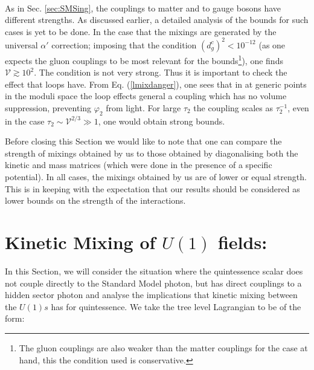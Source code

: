 \documentclass[11pt,a4paper]{article}
\newcommand{\V}{\mathcal{V}}
\def\pref#1{(\ref{#1})}
\begin{document}
\\ 
As in Sec. \ref{sec:SMSing}, the couplings to matter and to gauge bosons have different strengths. As discussed earlier, a detailed
analysis of the bounds for such cases is yet to be done. In the case that the mixings are generated by the universal $\alpha'$ correction; imposing that the condition $\left(d_g^c\right)^2 < 10^{-12}$ (as one expects the gluon couplings to be most relevant for the bounds\footnote{The gluon couplings are also weaker than the matter couplings for the case at hand, this the condition used is conservative.}), one finds $\V \gtrsim 10^2 $. The condition is not very strong. Thus it is important to check the effect that loops  have. From Eq. \pref{lmixdanger}, one sees that in at generic points in the moduli space the loop effects general a coupling which has no volume suppression, preventing $\varphi_2$ from light. For large $\tau_2$ the coupling scales as $\tau_2^{-1}$, even in the case $\tau_2 \sim \V^{2/3} \gg 1$, one would obtain strong bounds.

\vspace{0.5cm}

Before closing this Section we would like to note that one can compare the strength of mixings obtained by us to those obtained by diagonalising both the kinetic and mass matrices \cite{Conlon:2007gk, Cicoli:2010ha} (which were done in the presence of a specific potential). In all cases, the mixings obtained by us are of lower or equal strength. This is in keeping with the expectation that our results should be considered as lower bounds on the strength of the interactions.

\section{Kinetic Mixing of $U(1)$ fields:}
\label{sec:uone}

In this Section, we will consider the situation where the quintessence scalar does not couple directly to the Standard Model photon, but
has direct couplings to a hidden sector photon and analyse the implications that kinetic mixing between the $U(1)s$ has for quintessence. We take the tree level Lagrangian to be of the form:
\end{document}
